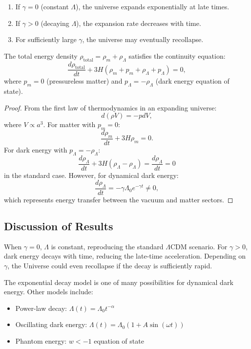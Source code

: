 \begin{proposition}
\begin{enumerate}
\item If $\gamma = 0$ (constant $\Lambda$), the universe expands exponentially at late times.
\item If $\gamma > 0$ (decaying $\Lambda$), the expansion rate decreases with time.
\item For sufficiently large $\gamma$, the universe may eventually recollapse.
\end{enumerate}
\end{proposition}

\begin{theorem}
The total energy density $\rho_{\text{total}} = \rho_m + \rho_{\Lambda}$ satisfies the continuity equation:
\[
\frac{d\rho_{\text{total}}}{dt} + 3H(\rho_m + p_m + \rho_{\Lambda} + p_{\Lambda}) = 0,
\]
where $p_m = 0$ (pressureless matter) and $p_{\Lambda} = -\rho_{\Lambda}$ (dark energy equation of state).
\end{theorem}

\begin{proof}
From the first law of thermodynamics in an expanding universe:
\[
d(\rho V) = -p dV,
\]
where $V \propto a^3$. For matter with $p_m = 0$:
\[
\frac{d\rho_m}{dt} + 3H\rho_m = 0.
\]
For dark energy with $p_{\Lambda} = -\rho_{\Lambda}$:
\[
\frac{d\rho_{\Lambda}}{dt} + 3H(\rho_{\Lambda} - \rho_{\Lambda}) = \frac{d\rho_{\Lambda}}{dt} = 0
\]
in the standard case. However, for dynamical dark energy:
\[
\frac{d\rho_{\Lambda}}{dt} = -\gamma \Lambda_0 e^{-\gamma t} \neq 0,
\]
which represents energy transfer between the vacuum and matter sectors.
\end{proof}

\subsection{Discussion of Results}

When $\gamma = 0$, $\Lambda$ is constant, reproducing the standard $\Lambda$CDM scenario. For $\gamma > 0$, dark energy decays with time, reducing the late-time acceleration. Depending on $\gamma$, the Universe could even recollapse if the decay is sufficiently rapid.

\begin{remark}
The exponential decay model is one of many possibilities for dynamical dark energy. Other models include:
\begin{itemize}
\item Power-law decay: $\Lambda(t) = \Lambda_0 t^{-\alpha}$
\item Oscillating dark energy: $\Lambda(t) = \Lambda_0(1 + A\sin(\omega t))$
\item Phantom energy: $w < -1$ equation of state
\end{itemize}
\end{remark}

